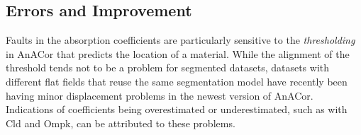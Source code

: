 






\subsection{Errors and Improvement}

Faults in the absorption coefficients are particularly sensitive to the \textit{thresholding} in AnACor that predicts the location of a material. While the alignment of the threshold tends not to be a problem for segmented datasets, datasets with different flat fields that reuse the same segmentation model have recently been having minor displacement problems in the newest version of AnACor. Indications of coefficients being overestimated or underestimated, such as with Cld and Ompk, can be attributed to these problems.  

